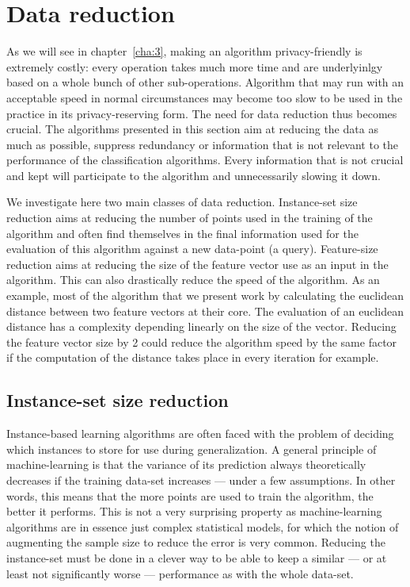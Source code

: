 \section{Data reduction}
As we will see in chapter~\ref{cha:3}, making an algorithm privacy-friendly is extremely costly: every operation takes much more time and are underlyinlgy based on a whole bunch of other sub-operations. Algorithm that may run with an acceptable speed in normal circumstances may become too slow to be used in the practice in its privacy-reserving form. The need for data reduction thus becomes crucial. The algorithms presented in this section aim at reducing the data as much as possible, suppress redundancy or information that is not relevant to the performance of the classification algorithms. Every information that is not crucial and kept will participate to the algorithm and unnecessarily slowing it down.

We investigate here two main classes of data reduction. Instance-set size reduction aims at reducing the number of points used in the training of the algorithm and often find themselves in the final information used for the evaluation of this algorithm against a new data-point (a query). Feature-size reduction aims at reducing the size of the feature vector use as an input in the algorithm. This can also drastically reduce the speed of the algorithm. As an example, most of the algorithm that we present work by calculating the euclidean distance between two feature vectors at their core. The evaluation of an euclidean distance has a complexity depending linearly on the size of the vector. Reducing the feature vector size by 2 could reduce the algorithm speed by the same factor if the computation of the distance takes place in every iteration for example.

\subsection{Instance-set size reduction}
Instance-based learning algorithms are often faced with the problem of deciding which instances to store for use during generalization. A general principle of machine-learning is that the variance of its prediction always theoretically decreases if the training data-set increases --- under a few assumptions. In other words, this means that the more points are used to train the algorithm, the better it performs. This is not a very surprising property as machine-learning algorithms are in essence just complex statistical models, for which the notion of augmenting the sample size to reduce the error is very common. Reducing the instance-set must be done in a clever way to be able to keep a similar --- or at least not significantly worse --- performance as with the whole data-set.  

